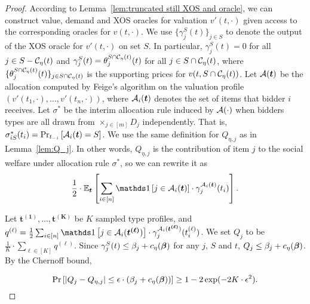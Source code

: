 \begin{proof}
	According to Lemma~\ref{lem:truncated still XOS and oracle}, we can construct value, demand and XOS oracles for valuation $v'(t,\cdot)$ given access to the corresponding oracles for $v(t,\cdot)$. We use $\{\gamma_j^S(t)\}_{j\in S}$ to denote the output of the XOS oracle for $v'(t,\cdot)$ on set $S$. In particular, $\gamma_j^S(t)=0$ for all $j\in S-\CC_\eta(t)$ and $\gamma_j^S(t)=\theta_j^{S\cap\CC_\eta(t)}(t)$ for all $j\in S\cap\CC_\eta(t)$, where $\{\theta_j^{S\cap\CC_\eta(t)}(t)\}_{j\in {S\cap\CC_\eta(t)}}$ is the supporting prices for $v(t,{S\cap\CC_\eta(t)})$. 
	Let $\AA(\boldsymbol{t})$ be the allocation computed by Feige's algorithm on the valuation profile $\left(v'(t_1,\cdot),\ldots,v'(t_n,\cdot)\right)$, where $\AA_i(\boldsymbol{t})$ denotes the set of items that bidder $i$ receives. 
	Let $\sigma^*$ be the interim allocation rule induced by $\AA(\cdot)$ when bidders types are all drawn from $\times_{j\in[m]} D_j$ independently. 
	That is, $\sigma^*_{iS}(t_i)=\Pr_{t_{-i}}\left[\AA_i(\boldsymbol{t})=S\right]$. 
	We use the same definition for $Q_{\eta,j}$ as in Lemma~\ref{lem:Q_j}. 
	In other words, $Q_{\eta,j}$ is the contribution of item $j$ to the social welfare under allocation rule $\sigma^*$, so we can rewrite it as $$\frac{1}{2}\cdot\E_{\boldsymbol{t}}\left[\sum_{i\in[n]} \ind\left[j\in \AA_i(\boldsymbol{t})\right]\cdot \gamma_j^{\AA_i(\boldsymbol{t})}(t_i)\right].$$ %
	
	Let $\boldsymbol{t^{(1)}},\ldots, \boldsymbol{t^{(K)}}$ be $K$ sampled type profiles, and $q^{(\ell)}=\frac{1}{2}\sum_{i\in[n]} \ind\left[j\in \AA_i(\boldsymbol{t^{(\ell)}})\right]\cdot \gamma_j^{\AA_i(\boldsymbol{t^{(\ell)}})}(t^{(\ell)}_i)$. 
	We set $Q_j$ to be $\frac{1}{K}\cdot\sum_{\ell\in[K]} q^{(\ell)}$. Since $\gamma^S_j(t)\leq \beta_j+c_\eta(\bbeta)$ for any $j$, $S$ and $t$, $Q_{j}\leq \beta_j+c_\eta(\bbeta)$. By the Chernoff bound, 
	
	$$\Pr\left[\left|Q_j-Q_{\eta,j}\right|\leq \epsilon\cdot \left(\beta_j+c_\eta(\bbeta)\right) \right]\geq 1-2\exp(-2K\cdot \epsilon^2).$$
	

\end{proof}
